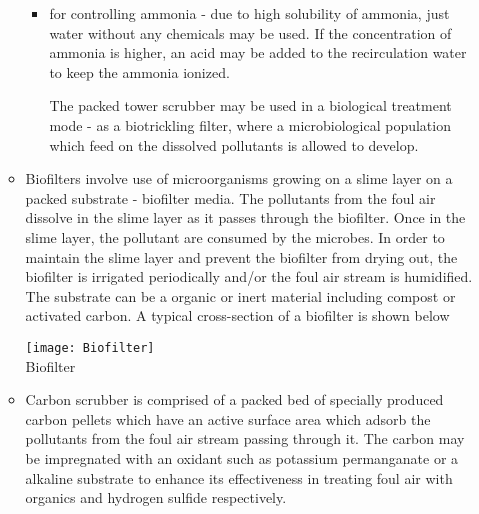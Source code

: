 \begin{itemize}
\begin{itemize}
\begin{itemize}
			\item for controlling ammonia - due to high solubility of ammonia, just water without any chemicals may be used.  If the concentration of ammonia is higher, an acid may be added to the recirculation water to keep the ammonia ionized.

The packed tower scrubber may be used in a biological treatment mode - as a biotrickling filter, where a microbiological population which feed on the dissolved pollutants is allowed to develop. 
 	\end{itemize}
 		\item Biofilters involve use of microorganisms growing on a slime layer on a packed substrate - biofilter media.  The pollutants from the foul air dissolve in the slime layer as it passes through the biofilter.  Once in the slime layer, the pollutant are consumed by the microbes.  In order to maintain the slime layer and prevent the biofilter from drying out, the biofilter is irrigated periodically and/or the foul air stream is humidified.  The substrate can be a organic or inert material including compost or activated carbon.  A typical cross-section of a biofilter is shown below
 
\begin{center}
\texttt{[image: Biofilter]}\\
Biofilter
\end{center}
		\item Carbon scrubber is comprised of a  packed bed of specially produced carbon pellets which have an active surface area which adsorb the pollutants from the foul air stream passing through it. The carbon may be impregnated with an oxidant such as potassium permanganate or a alkaline substrate to enhance its effectiveness in treating foul air with organics and hydrogen sulfide respectively.
\end{itemize}
\end{itemize}